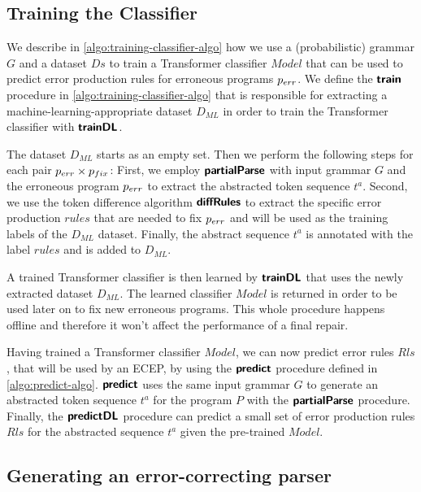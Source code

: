 \subsection{Training the Classifier}
\label{sec:whole-system:training-classifier}



We describe in \autoref{algo:training-classifier-algo} how we use a
(probabilistic) grammar $G$ and a dataset $Ds$ to train a Transformer classifier
$Model$ that can be used to predict error production rules for erroneous
programs $p_{err}$. We define the $\bm{\mathsf{train}}$ procedure in
\autoref{algo:training-classifier-algo} that is responsible for extracting a
machine-learning-appropriate dataset $D_{ML}$ in order to train the Transformer
classifier with $\bm{\mathsf{trainDL}}$.

The dataset $D_{ML}$ starts as an empty set. Then we perform the following steps
for each pair $p_{err} \times p_{fix}$: First, we employ $\bm{\mathsf{partialParse}}$ with input
grammar $G$ and the erroneous program $p_{err}$ to extract the abstracted token
sequence $t^a$. Second, we use the token difference algorithm $\bm{\mathsf{diffRules}}$ to
extract the specific error production $rules$ that are needed to fix $p_{err}$ and
will be used as the training labels of the $D_{ML}$ dataset. Finally, the
abstract sequence $t^a$ is annotated with the label $rules$ and is added to
$D_{ML}$.

A trained Transformer classifier is then learned by $\bm{\mathsf{trainDL}}$ that uses the
newly extracted dataset $D_{ML}$. The learned classifier $Model$ is returned in
order to be used later on to fix new erroneous programs. This whole procedure
happens offline and therefore it won't affect the performance of a final repair.



Having trained a Transformer classifier $Model$, we can now predict error rules
$Rls$, that will be used by an ECEP, by using the $\bm{\mathsf{predict}}$ procedure
defined in \autoref{algo:predict-algo}. $\bm{\mathsf{predict}}$ uses the same input
grammar $G$ to generate an abstracted token sequence $t^a$ for the program $P$
with the $\bm{\mathsf{partialParse}}$ procedure. Finally, the $\bm{\mathsf{predictDL}}$ procedure can
predict a small set of error production rules $Rls$ for the abstracted sequence
$t^a$ given the pre-trained $Model$.

\subsection{Generating an error-correcting parser}
\label{sec:whole-system:building-ecp}

